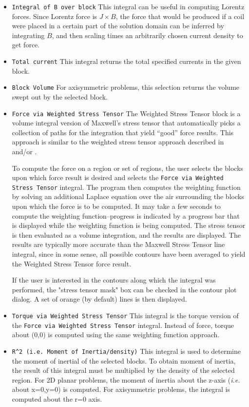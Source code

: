 \documentclass[12pt]{report}
\begin{document}
\begin{itemize}
torque about $(0,0)$ resulting from Lorentz forces.
\item {\tt Integral of B over block}  This integral can be useful
in computing Lorentz forces.  Since Lorentz force is $J \times B$,
the force that would be produced if a coil were placed in a certain
part of the solution domain can be inferred by integrating $B$, and
then scaling times an arbitrarily chosen current density to get
force.
\item {\tt Total current}  This integral returns the total
specified currents in the given block.
\item {\tt Block Volume} For axisymmetric problems, this selection
returns the volume swept out by the selected block.
\item {\tt Force via Weighted Stress Tensor} The Weighted Stress
Tensor block is a volume integral version of Maxwell's stress
tensor that automatically picks a collection of paths for the
integration that yield ``good'' force results. This approach is
similar to the weighted stress tensor approach described in
\cite{mcfee} and/or \cite{henforce}.

To compute the force on a region or set of regions, the user
selects the blocks upon which force result is desired and selects the {\tt Force via Weighted Stress Tensor} integral.  The
program then computes the weighting function by solving an
additional Laplace equation over the air surrounding the blocks upon which the force is to be computed.
It may take a few seconds to compute the weighting
function--progress is indicated by a progress bar that is
displayed while the weighting function is being computed. The
stress tensor is then evaluated as a volume integration, and the
results are displayed.  The results are typically more accurate
than the Maxwell Stress Tensor line integral, since in some sense,
all possible contours have been averaged to yield the Weighted
Stress Tensor force result.

If the user is interested in the contours along which the integral
was performed, the "stress tensor mask" box can be checked in the
contour plot dialog.  A set of orange (by default) lines is then
displayed.

\item {\tt Torque via Weighted Stress Tensor}  This integral is the
torque version of the {\tt Force via Weighted Stress Tensor}
integral. Instead of force, torque about (0,0) is computed using
the same weighting function approach.

\item \verb+R^2 (i.e. Moment of Inertia/density)+  This integral is
used to determine the moment of inertial of the selected blocks.  To
obtain moment of inertia, the result of this integral must be multiplied
by the density of the selected region.  For 2D planar problems, the
moment of inertia about the z-axis ({\em i.e.} about x=0,y=0) is computed.
For axisymmetric problems, the integral is computed about the r=0 axis.


\end{itemize}
\end{document}
